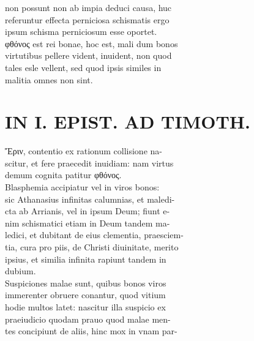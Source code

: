 \documentclass{article}
\begin{document}
\begin{pages}
                non possunt non ab impia deduci causa, huc \\
                referuntur effecta perniciosa schismatis ergo \\
                ipsum schisma perniciosum esse oportet. \\
                φθόνος est rei bonae, hoc est, mali dum bonos \\
                virtutibus pellere vident, inuident, non quod \\
                tales esle vellent, sed quod ipsis similes in \\
                malitia omnes non sint. \\
                
\section*{IN I. EPIST. AD TIMOTH. \\
                }
Ἔριν, contentio ex rationum collisione na- \\
                scitur, et fere praecedit inuidiam: nam virtus \\
                demum cognita patitur φθόνος. \\
                Blasphemia accipiatur vel in viros bonos: \\
                sic Athanasius infinitas calumnias, et maledi- \\
                cta ab Arrianis, vel in ipsum Deum; fiunt e- \\
                nim schismatici etiam in Deum tandem ma- \\
                ledici, et dubitant de eius clementia, praesciem- \\
                tia, cura pro piis, de Christi diuinitate, merito \\
                ipsius, et similia infinita rapiunt tandem in \\
                dubium. \\
                Suspiciones malae sunt, quibus bonos viros \\
                immerenter obruere conantur, quod vitium \\
                hodie multos latet: nascitur illa suspicio ex \\
                praeiudicio quodam prauo quod malae men- \\
                tes concipiunt de aliis, hinc mox in vnam par- \\

\end{pages}
\end{document}
